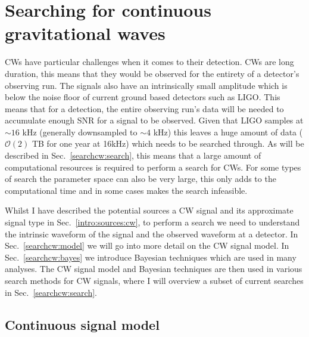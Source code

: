 \chapter{\label{searchcw}Searching for continuous gravitational waves}

\glspl{CW} have
particular challenges when it comes to their detection.  \glspl{CW} are long
duration, this means that they would be observed for the entirety of a
detector's observing run.  The signals also have an intrinsically small
amplitude which is below the noise floor of current ground based detectors such
as \gls{LIGO}.  This means that for a detection, the entire observing
run's data will be needed to
accumulate enough \gls{SNR} for a signal to be observed.  Given that \gls{LIGO}
samples at $\sim 16$ kHz (generally downsampled to $\sim 4$ kHz) this leaves a
huge amount of data ($\mathcal{O}(2)$ TB for one year at 16kHz) which needs to be searched through.  As will be described in Sec.~\ref{searchcw:search}, this means that a large amount of computational resources is required to perform a search for \glspl{CW}.
For some types of search the parameter space can also be very large, this only
adds to the computational time and in some cases makes the search
infeasible.

Whilst I have described the potential sources a \gls{CW} signal and its approximate
signal type in Sec.~\ref{intro:sources:cw}, to perform a search we need to understand the
intrinsic waveform of the signal and the observed waveform at a detector.  In 
Sec.~\ref{searchcw:model} we will go into more
detail on the \gls{CW} signal model. In Sec.~\ref{searchcw:bayes} we introduce Bayesian techniques which are used in many analyses. The \gls{CW} signal model and Bayesian techniques are then used in various search methods for
\gls{CW} signals, where I will overview a subset of current searches in
Sec.~\ref{searchcw:search}.

\section{\label{searchcw:model}Continuous signal model}

